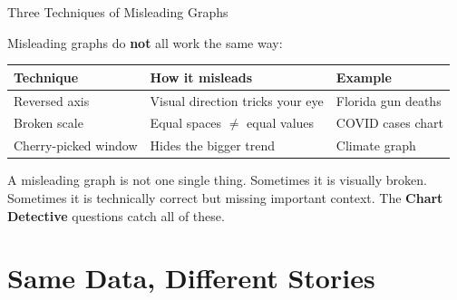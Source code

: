 \documentclass[9pt,english,aspectratio=169]{beamer}
\begin{document}
\begin{frame}{Three Techniques of Misleading Graphs}

  \vspace{0.5em}
  Misleading graphs do \textbf{not} all work the same way:

  \vspace{0.5em}
  \centering
  \begin{tabular}{l l l}
    \toprule
    \textbf{Technique} & \textbf{How it misleads} & \textbf{Example} \\
    \midrule
    Reversed axis & Visual direction tricks your eye & Florida gun deaths \\[0.3em]
    Broken scale & Equal spaces $\neq$ equal values & COVID cases chart \\[0.3em]
    Cherry-picked window & Hides the bigger trend & Climate graph \\
    \bottomrule
  \end{tabular}

  \vspace{0.8em}
  A misleading graph is not one single thing. Sometimes it is visually broken. Sometimes it is technically correct but missing important context. The \textbf{Chart Detective} questions catch all of these.

\end{frame}

\section{Same Data, Different Stories}
\end{document}
